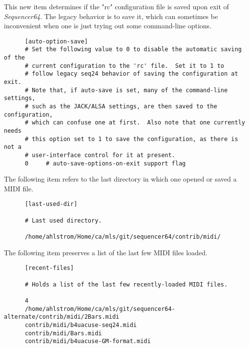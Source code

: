    This new item determines if the "rc" configuration file is saved
   upon exit of \textsl{Sequencer64}.  The legacy behavior is to save it,
   which can sometimes be inconvenient when one is just trying out some
   command-line options.

   \begin{verbatim}
      [auto-option-save]
      # Set the following value to 0 to disable the automatic saving of the
      # current configuration to the 'rc' file.  Set it to 1 to
      # follow legacy seq24 behavior of saving the configuration at exit.
      # Note that, if auto-save is set, many of the command-line settings,
      # such as the JACK/ALSA settings, are then saved to the configuration,
      # which can confuse one at first.  Also note that one currently needs
      # this option set to 1 to save the configuration, as there is not a
      # user-interface control for it at present.
      0     # auto-save-options-on-exit support flag
   \end{verbatim}

   The following item refers to the last directory in which one opened or
   saved a MIDI file.

   \begin{verbatim}
      [last-used-dir]

      # Last used directory.

      /home/ahlstrom/Home/ca/mls/git/sequencer64/contrib/midi/
   \end{verbatim}

   The following item preserves a list of the last few MIDI files loaded.

   \begin{verbatim}
      [recent-files]

      # Holds a list of the last few recently-loaded MIDI files.

      4
      /home/ahlstrom/Home/ca/mls/git/sequencer64-alternate/contrib/midi/2Bars.midi
      contrib/midi/b4uacuse-seq24.midi
      contrib/midi/Bars.midi
      contrib/midi/b4uacuse-GM-format.midi
   \end{verbatim}


